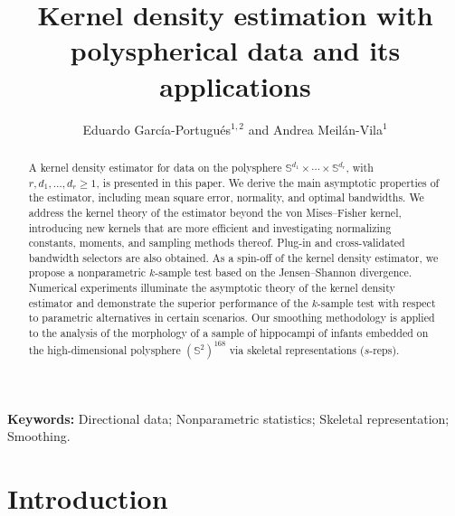\documentclass[oneside,11pt]{article}
\newif\ifmain
\begin{document}
\ifmain

\title{Kernel density estimation with polyspherical data and its applications}
\setlength{\droptitle}{-1cm}
\predate{}%
\postdate{}%
\date{}

\author{Eduardo Garc\'ia-Portugu\'es$^{1,2}$ and Andrea Meil\'an-Vila$^{1}$}
\maketitle

\begin{abstract}
A kernel density estimator for data on the polysphere $\mathbb{S}^{d_1}\times\cdots\times\mathbb{S}^{d_r}$, with $r,d_1,\ldots,d_r\geq 1$, is presented in this paper. We derive the main asymptotic properties of the estimator, including mean square error, normality, and optimal bandwidths. We address the kernel theory of the estimator beyond the von Mises--Fisher kernel, introducing new kernels that are more efficient and investigating normalizing constants, moments, and sampling methods thereof. Plug-in and cross-validated bandwidth selectors are also obtained. As a spin-off of the kernel density estimator, we propose a nonparametric $k$-sample test based on the Jensen--Shannon divergence. Numerical experiments illuminate the asymptotic theory of the kernel density estimator and demonstrate the superior performance of the $k$-sample test with respect to parametric alternatives in certain scenarios. Our smoothing methodology is applied to the analysis of the morphology of a sample of hippocampi of infants embedded on the high-dimensional polysphere $(\mathbb{S}^2)^{168}$ via skeletal representations ($s$-reps).
\end{abstract}
\begin{flushleft}
	\small\textbf{Keywords:} Directional data; Nonparametric statistics; Skeletal representation; Smoothing.
\end{flushleft}

\section{Introduction}
\label{sec:intro}
\end{document}
